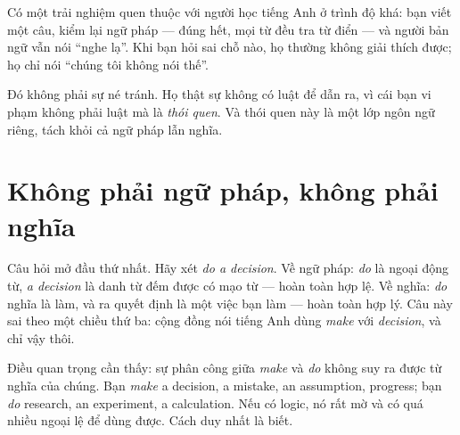 \documentclass[../../english.tex]{subfiles}
\begin{document}
Có một trải nghiệm quen thuộc với người học tiếng Anh ở trình độ khá: bạn viết một câu, kiểm lại ngữ pháp --- đúng hết, mọi từ đều tra từ điển --- và người bản ngữ vẫn nói ``nghe lạ''. Khi bạn hỏi sai chỗ nào, họ thường không giải thích được; họ chỉ nói ``chúng tôi không nói thế''.

Đó không phải sự né tránh. Họ thật sự không có luật để dẫn ra, vì cái bạn vi phạm không phải luật mà là \emph{thói quen}. Và thói quen này là một lớp ngôn ngữ riêng, tách khỏi cả ngữ pháp lẫn nghĩa.

\section{Không phải ngữ pháp, không phải nghĩa}

Câu hỏi mở đầu thứ nhất. Hãy xét \emph{do a decision}. Về ngữ pháp: \emph{do} là ngoại động từ, \emph{a decision} là danh từ đếm được có mạo từ --- hoàn toàn hợp lệ. Về nghĩa: \emph{do} nghĩa là làm, và ra quyết định là một việc bạn làm --- hoàn toàn hợp lý. Câu này sai theo một chiều thứ ba: cộng đồng nói tiếng Anh dùng \emph{make} với \emph{decision}, và chỉ vậy thôi.

Điều quan trọng cần thấy: sự phân công giữa \emph{make} và \emph{do} không suy ra được từ nghĩa của chúng. Bạn \emph{make} a decision, a mistake, an assumption, progress; bạn \emph{do} research, an experiment, a calculation. Nếu có logic, nó rất mờ và có quá nhiều ngoại lệ để dùng được. Cách duy nhất là biết.

\begin{tuvung}
\end{tuvung}
\end{document}
